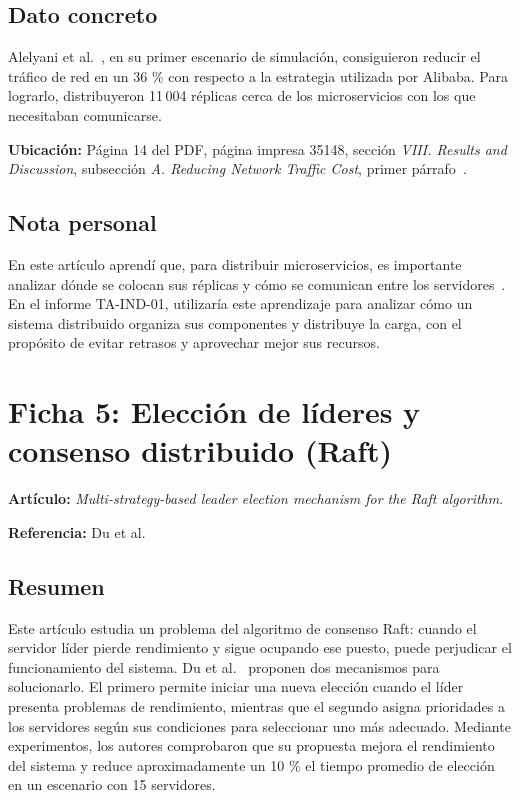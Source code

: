 \documentclass[12pt,a4paper]{article}
\begin{document}
\subsection*{Dato concreto}

Alelyani et al.~\cite{alelyani2024}, en su primer escenario de simulación, consiguieron reducir el tráfico de red en un 36 \% con respecto a la estrategia utilizada por Alibaba. Para lograrlo, distribuyeron 11\,004 réplicas cerca de los microservicios con los que necesitaban comunicarse.

\textbf{Ubicación:} Página 14 del PDF, página impresa 35148, sección \textit{VIII. Results and Discussion}, subsección \textit{A. Reducing Network Traffic Cost}, primer párrafo~\cite{alelyani2024}.

\subsection*{Nota personal}

En este artículo aprendí que, para distribuir microservicios, es importante analizar dónde se colocan sus réplicas y cómo se comunican entre los servidores~\cite{alelyani2024}. En el informe TA-IND-01, utilizaría este aprendizaje para analizar cómo un sistema distribuido organiza sus componentes y distribuye la carga, con el propósito de evitar retrasos y aprovechar mejor sus recursos.

\section*{Ficha 5: Elección de líderes y consenso distribuido (Raft)}

\noindent\textbf{Artículo:} \textit{Multi-strategy-based leader election mechanism for the Raft algorithm}.

\noindent\textbf{Referencia:} Du et al.~\cite{du2023}

\subsection*{Resumen}

Este artículo estudia un problema del algoritmo de consenso Raft: cuando el servidor líder pierde rendimiento y sigue ocupando ese puesto, puede perjudicar el funcionamiento del sistema. Du et al.~\cite{du2023} proponen dos mecanismos para solucionarlo. El primero permite iniciar una nueva elección cuando el líder presenta problemas de rendimiento, mientras que el segundo asigna prioridades a los servidores según sus condiciones para seleccionar uno más adecuado. Mediante experimentos, los autores comprobaron que su propuesta mejora el rendimiento del sistema y reduce aproximadamente un 10 \% el tiempo promedio de elección en un escenario con 15 servidores.
\end{document}
